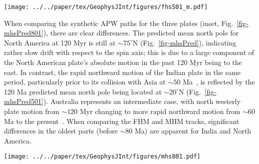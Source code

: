 \begin{figure*}
\centering
\texttt{[image: ../../paper/tex/GeophysJInt/figures/fhs501\_m.pdf]}
\caption[120 Ma MHM vs FHM predicted APWP of India]{MHM predicted
120 Ma APWP (solid line) for India through the
India\textendash{}Somalia\textendash{}Nubia\textendash{}Mantle plate circuit.
Its age step is 5 Myr. The dashed line is the FHM predicted path shown for
comparison. The inset shows paths for fast moving India and also much slower
moving North America shown in Fig.~\ref{fig-mhsPred}.}\label{fig-mhsPred501}
\end{figure*}

When comparing the synthetic APW paths for the three plates (inset,
Fig.~\ref{fig-mhsPred801}), there are clear differences. The predicted mean
north pole for North America at 120 Myr is still at ${\sim}75^{\circ}$N
(Fig.~\ref{fig-mhsPred}), indicating rather slow drift with respect to the spin
axis; this is due to a large component of the North American plate's absolute
motion in the past 120 Myr being to the east. In contrast, the rapid northward
motion of the Indian plate in the same period, particularly prior to its
collision with Asia at ${\sim}50$ Ma~\citep{N10}, is reflected by
the 120 Ma predicted mean north pole being located at ${\sim}20^{\circ}$N
(Fig.~\ref{fig-mhsPred501}). Australia represents an intermediate case, with
north westerly plate motion from ${\sim}120$ Myr changing to more
rapid northward motion from ${\sim}60$ Ma to the present~\citep{W07}.
When comparing the FHM and MHM tracks, significant differences in the oldest
parts (before ${\sim}80$ Ma) are apparent for India and North America.

\begin{figure*}
\centering
\texttt{[image: ../../paper/tex/GeophysJInt/figures/mhs801.pdf]}
\caption[120 Ma MHM vs FHM predicted APWP of Australia]{MHM
predicted 120 Ma APWP (solid line) for Australia through the
Australia\textendash{}East
Antarctica\textendash{}Somalia\textendash{}Nubia\textendash{}Mantle plate
circuit. Its age step is 5 Myr. The dashed line is the FHM predicted path shown
for comparison. The inset shows paths for fast moving India shown in
Fig.~\ref{fig-mhsPred501}, much slower moving North America shown in
Fig.~\ref{fig-mhsPred}, and also relatively intermediate moving
Australia.}\label{fig-mhsPred801}
\end{figure*}


